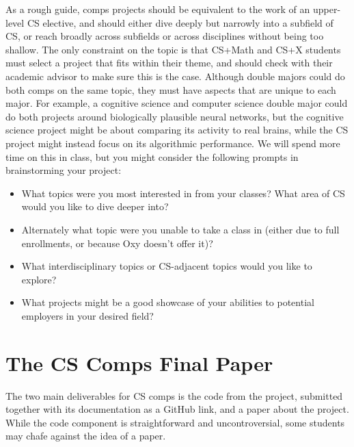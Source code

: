 \documentclass[10pt,twocolumn]{article}
\begin{document}
As a rough guide, comps projects should be equivalent to the work of an upper-level CS elective, and should either dive deeply but narrowly into a subfield of CS, or reach broadly across subfields or across disciplines without being too shallow.
The only constraint on the topic is that CS+Math and CS+X students must select a project that fits within their theme, and should check with their academic advisor to make sure this is the case.
Although double majors could do both comps on the same topic, they must have aspects that are unique to each major.
For example, a cognitive science and computer science double major could do both projects around biologically plausible neural networks, but the cognitive science project might be about comparing its activity to real brains, while the CS project might instead focus on its algorithmic performance.
We will spend more time on this in class, but you might consider the following prompts in brainstorming your project:

\begin{itemize}
    \item What topics were you most interested in from your classes? What area of CS would you like to dive deeper into?
    \item Alternately what topic were you unable to take a class in (either due to full enrollments, or because Oxy doesn't offer it)?
    \item What interdisciplinary topics or CS-adjacent topics would you like to explore?
    \item What projects might be a good showcase of your abilities to potential employers in your desired field?
\end{itemize}

\section{The CS Comps Final Paper}

The two main deliverables for CS comps is the code from the project, submitted together with its documentation as a GitHub link, and a paper about the project.
While the code component is straightforward and uncontroversial, some students may chafe against the idea of a paper.

\end{document}
